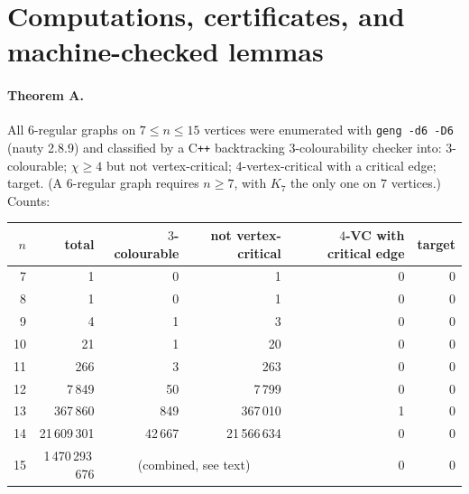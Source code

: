 \documentclass[11pt]{article}
\theoremstyle{remark}
\begin{document}
\section{Computations, certificates, and machine-checked lemmas}
\label{sec:computations}

\paragraph{Theorem A.} All $6$-regular graphs on $7\le n\le 15$ vertices were
enumerated with \texttt{geng -d6 -D6} (nauty 2.8.9) and classified by a C\texttt{++}
backtracking $3$-colourability checker into: $3$-colourable; $\chi\ge 4$ but not
vertex-critical; $4$-vertex-critical with a critical edge; target. (A $6$-regular
graph requires $n\ge 7$, with $K_7$ the only one on $7$ vertices.) Counts:

\begin{center}
\begin{tabular}{rrrrrr}
\toprule
$n$ & total & $3$-colourable & not vertex-critical & $4$-VC with critical edge &
target\\
\midrule
7  & 1 & 0 & 1 & 0 & 0\\
8  & 1 & 0 & 1 & 0 & 0\\
9  & 4 & 1 & 3 & 0 & 0\\
10 & 21 & 1 & 20 & 0 & 0\\
11 & 266 & 3 & 263 & 0 & 0\\
12 & 7\,849 & 50 & 7\,799 & 0 & 0\\
13 & 367\,860 & 849 & 367\,010 & 1 & 0\\
14 & 21\,609\,301 & 42\,667 & 21\,566\,634 & 0 & 0\\
15 & 1\,470\,293\,676 & \multicolumn{2}{c}{(combined, see text)} & 0 & 0\\
\bottomrule
\end{tabular}
\end{center}
\end{document}
